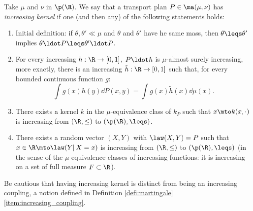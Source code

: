 \begin{prodefinition}\label{prodef:transitions}
Take $\mu$ and $\nu$ in $\p(\R)$. We say that a transport plan $P\in\ma(\mu,\nu)$ has \emph{increasing kernel} if one (and then any) of the following statements holds:
\begin{enumerate}
\item\label{prodef:transitionsa}
\label{item:transitions_croissantes_application_croissante} Initial definition: if $\theta,\theta'\ll \mu$ and $\theta$ and $\theta'$ have he same mass, then $\theta\leqs \theta'$ implies $\theta \ldot P\leqs \theta'\ldot P$.

\item\label{prodef:transitionsb}
\label{pt:condexp} For every increasing $h:\R\to[0,1]$, $P\ldot h$ is $\mu$-almost surely increasing, \ie more exactly, there is an increasing $\tilde{h}:\R\to [0,1]$ such that, for every bounded continuous function $g$:
\[\int g(x)h(y) \dd P(x,y)= \int g(x)\tilde{h}(x)\dd \mu(x).\]

\item\label{prodef:transitionsc}
There exists a kernel $k$ in the $\mu$-equivalence class of $k_P$ such that $x\mto k(x,\cdot)$ is increasing from $(\R,\leq)$ to $(\p(\R),\leqs)$.

\item\label{prodef:transitionsd}
There exists a random vector $(X,Y)$ with $\law(X,Y)=P$ such that $x\in\R\mto\law(Y|\,X=x)$ is increasing from $(\R,\leq)$ to $(\p(\R),\leqs)$ (in the sense of the $\mu$\nobreakdash-equi\-valence classes of {\small increasing} functions: it is increasing on a set of full measure $F\subset \R$).
\end{enumerate}
\end{prodefinition}

\begin{rem}Be cautious that having increasing kernel is distinct from being an increasing coupling, a notion defined in Definition \ref{defi:martingale}\eqref{item:increasing_coupling}.
\end{rem}

